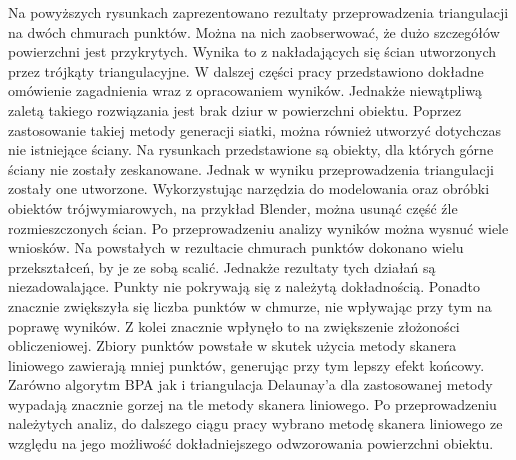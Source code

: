Na powyższych rysunkach zaprezentowano rezultaty przeprowadzenia triangulacji na dwóch chmurach punktów. Można na nich zaobserwować, że dużo szczegółów powierzchni jest przykrytych. Wynika to z nakładających się ścian utworzonych przez trójkąty triangulacyjne. W dalszej części pracy przedstawiono dokładne omówienie zagadnienia wraz z opracowaniem wyników. Jednakże niewątpliwą zaletą takiego rozwiązania jest brak dziur w powierzchni obiektu. Poprzez zastosowanie takiej metody generacji siatki, można również utworzyć dotychczas nie istniejące ściany. Na rysunkach przedstawione są obiekty, dla których górne ściany nie zostały zeskanowane. Jednak w wyniku przeprowadzenia triangulacji zostały one utworzone. Wykorzystując narzędzia do modelowania oraz obróbki obiektów trójwymiarowych, na przykład Blender, można usunąć część źle rozmieszczonych ścian.
\newline \indent Po przeprowadzeniu analizy wyników można wysnuć wiele wniosków. Na powstałych w rezultacie chmurach punktów dokonano wielu przekształceń, by je ze sobą scalić. Jednakże rezultaty tych działań są niezadowalające. Punkty nie pokrywają się z należytą dokładnością. Ponadto znacznie zwiększyła się liczba punktów w chmurze, nie wpływając przy tym na poprawę wyników. Z kolei znacznie wpłynęło to na zwiększenie złożoności obliczeniowej. Zbiory punktów powstałe w skutek użycia metody skanera liniowego zawierają mniej punktów, generując przy tym lepszy efekt końcowy. Zarówno algorytm BPA jak i triangulacja Delaunay'a dla zastosowanej metody wypadają znacznie gorzej na tle metody skanera liniowego. Po przeprowadzeniu należytych analiz, do dalszego ciągu pracy wybrano metodę skanera liniowego ze względu na jego możliwość dokładniejszego odwzorowania powierzchni obiektu.


